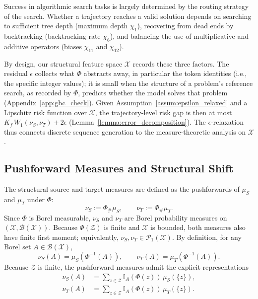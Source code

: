 Success in algorithmic search tasks is largely determined by the routing strategy of the search. Whether a trajectory reaches a valid solution depends on searching to sufficient tree depth (maximum depth $\chi_1$), recovering from dead ends by backtracking (backtracking rate $\chi_6$), and balancing the use of multiplicative and additive operators (biases $\chi_{11}$ and $\chi_{12}$). 

By design, our structural feature space $\mathcal{X}$ records these three factors. The residual $\epsilon$ collects what $\Phi$ abstracts away, in particular the token identities (i.e., the specific integer values); it is small when the structure of a problem's reference search, as recorded by $\Phi$, predicts whether the model solves that problem (Appendix~\ref{app:gbc_check}). Given Assumption~\ref{assum:epsilon_relaxed} and a Lipschitz risk function over $\mathcal{X}$, the trajectory-level risk gap is then at most $K_f\,W_1(\nu_S,\nu_T)+2\epsilon$ (Lemma~\ref{lemma:error_decomposition}). The $\epsilon$-relaxation thus connects discrete sequence generation to the measure-theoretic analysis on $\mathcal{X}$.

\subsection{Pushforward Measures and Structural Shift}
\label{app:pushforward}

The structural source and target measures are defined as the pushforwards of $\mu_S$ and $\mu_T$ under $\Phi$:
\begin{equation}
\nu_S := \Phi_{\#}\mu_S,
\qquad
\nu_T := \Phi_{\#}\mu_T.
\end{equation}
Since $\Phi$ is Borel measurable, $\nu_S$ and $\nu_T$ are Borel probability measures on $(\mathcal{X},\mathcal{B}(\mathcal{X}))$. Because $\Phi(\mathcal Z)$ is finite and $\mathcal X$ is bounded, both measures also have finite first moment; equivalently, $\nu_S,\nu_T\in\mathcal{P}_1(\mathcal X)$.
By definition, for any Borel set $A \in \mathcal{B}(\mathcal{X})$,
\begin{equation}
\nu_S(A) = \mu_S(\Phi^{-1}(A)),
\qquad
\nu_T(A) = \mu_T(\Phi^{-1}(A)).
\end{equation}
Because $\mathcal{Z}$ is finite, the pushforward measures admit the explicit representations
\begin{align}
\nu_S(A) &= \sum_{z \in \mathcal{Z}} \mathbb{I}_A(\Phi(z))\,\mu_S(\{z\}), \\
\nu_T(A) &= \sum_{z \in \mathcal{Z}} \mathbb{I}_A(\Phi(z))\,\mu_T(\{z\}).
\end{align}

